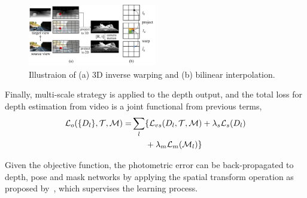 \begin{figure}
\centering
\includegraphics[width=0.5\textwidth]{figures/3d_warping.pdf}
\caption{Illustraion of (a) 3D inverse warping and (b) bilinear interpolation.}
\label{fig:3d_warping}
\vspace{-1\baselineskip}
\end{figure}

Finally, multi-scale strategy is applied to the depth output, and the total loss for depth estimation from video is a joint functional from previous terms,
\begin{align}
\label{eqn:full}
{\mathcal L}_{o}(\{D_l\}, {\mathcal T}, {\mathcal M}) =& \sum_l\{{\mathcal L}_{vs}(D_l,{\mathcal T},{\mathcal M}) + \lambda_s{\mathcal L}_{s}(D_l) \nonumber\\
&\text{~~~~~} + \lambda_m{\mathcal L}_{m}({\mathcal M}_l)\}
\end{align}

Given the objective function, the photometric error can be back-propagated to depth, pose and mask networks by applying the spatial transform operation as proposed by~\cite{jaderberg2015spatial}, which supervises the learning process.

